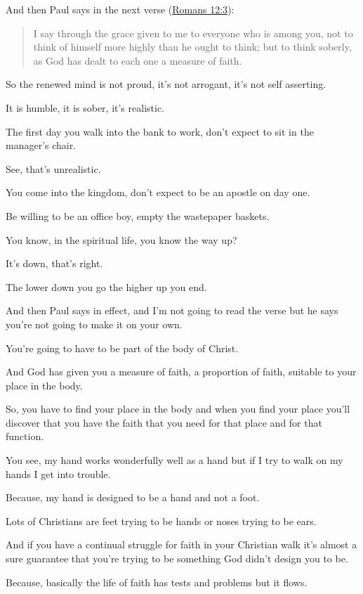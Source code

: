 \documentclass[11pt]{article}
\begin{document}
And then Paul says in the next verse (\href{https://www.biblegateway.com/passage/?search=Romans\%2012\%3A3\&version=ESV}{Romans 12:3}):

\begin{quote}
I say through the grace given to me to everyone who
is among you, not to think of himself more
highly than he ought to think; but to think
soberly, as God has dealt to each one a
measure of faith.
\end{quote}

So the renewed mind is not proud, it's not
arrogant, it's not self asserting.

It is humble, it is sober, it's realistic.

The first day you walk into the bank to work,
don't expect to sit in the manager's chair.

See, that's unrealistic.

You come into the kingdom, don't expect to be
an apostle on day one.

Be willing to be an office boy, empty the
wastepaper baskets.

You know, in the spiritual life, you know the
way up?

It's down, that's right.

The lower down you go the higher up you end.

And then Paul says in effect, and I'm not
going to read the verse but he says you're not
going to make it on your own.

You're going to have to be part of the body of
Christ.

And God has given you a measure of faith, a
proportion of faith, suitable to your place in
the body.

So, you have to find your place in the body
and when you find your place you'll discover
that you have the faith that you need for that
place and for that function.

You see, my hand works wonderfully well as a
hand but if I try to walk on my hands I get
into trouble.

Because, my hand is designed to be a hand and
not a foot.

Lots of Christians are feet trying to be hands
or noses trying to be ears.

And if you have a continual struggle for faith
in your Christian walk it's almost a sure
guarantee that you're trying to be something
God didn't design you to be.

Because, basically the life of faith has tests
and problems but it flows.
\end{document}
